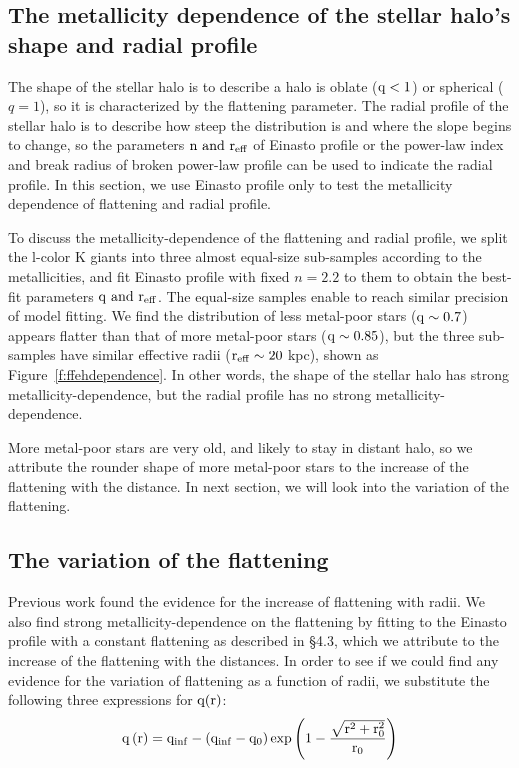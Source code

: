 \documentclass[12pt,preprint]{aastex}
\begin{document}
\subsection{The metallicity dependence of the stellar halo's shape and radial profile}
The shape of the stellar halo is to describe a halo is oblate ($\rm q<1$) or spherical ($q=1$), so it is characterized by the flattening parameter. The radial profile of the stellar halo is to describe how steep the distribution is and where the slope begins to change, so the parameters $\rm n~ and ~r_{eff}$ of Einasto profile or the power-law index and break radius of broken power-law profile can be used to indicate the radial profile. In this section, we use Einasto profile only to test the metallicity dependence of flattening and radial profile.
 
To discuss the metallicity-dependence of the flattening and radial profile, we split the l-color K giants into three almost equal-size sub-samples according to the metallicities, and fit Einasto profile with fixed $n=2.2$ to them to obtain the best-fit parameters $\rm q ~and ~r_{eff}$. The equal-size samples enable to reach similar precision of model fitting. We find the distribution of less metal-poor stars ($\rm q\sim0.7$) appears flatter than that of more metal-poor stars ($\rm q\sim0.85$), but the three sub-samples have similar effective radii ($\rm r_{eff}\sim20~$kpc), shown as Figure~\ref{f:ffehdependence}. In other words, the shape of the stellar halo has strong metallicity-dependence, but the radial profile has no strong metallicity-dependence.

More metal-poor stars are very old, and likely to stay in distant halo, so we attribute the rounder shape of more metal-poor stars to the increase of the flattening with the distance. In next section, we will look into the variation of the flattening.      

\subsection{The variation of the flattening}
Previous work found the evidence for the increase of flattening with radii\citep{Preston1991}. We also find strong metallicity-dependence on the flattening by fitting to the Einasto profile with a constant flattening as described in \S 4.3, which we attribute to the increase of the flattening with the distances. In order to see if we could find any evidence for the variation of flattening as a function of radii, we substitute the following three expressions for $\rm q(r)$:
\begin{equation}
\rm q\left(r\right)=q_{inf}-\left(q_{inf}-q_0\right)exp\left(1-\frac{\sqrt{r^2+r_0^2}}{r_0}\right)
\end{equation}
\end{document}
